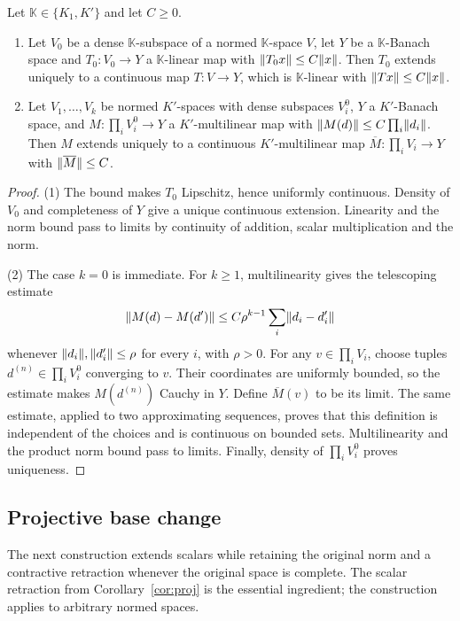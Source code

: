 \begin{samepage}
\begin{lemma}[extension]\label{lem:ext}
Let $\mathbb K\in\{K_1,K'\}$ and let $C\ge0$.
\begin{enumerate}
\item Let $V_0$ be a dense $\mathbb K$\nobreakdash-subspace of a normed $\mathbb K$\nobreakdash-space $V$, let $Y$ be a
$\mathbb K$\nobreakdash-Banach space and $T_0\colon V_0\to Y$ a $\mathbb K$\nobreakdash-linear map with $\lVert T_0x\rVert\le C\lVert x\rVert$. Then $T_0$ extends
uniquely to a continuous map $T\colon V\to Y$, which is $\mathbb K$\nobreakdash-linear with $\lVert Tx\rVert\le C\lVert x\rVert$.
\item Let $V_1,\dots,V_k$ be normed $K'$\nobreakdash-spaces with dense subspaces $V_i^0$, $Y$ a $K'$\nobreakdash-Banach space, and
$M\colon\prod_iV_i^0\to Y$ a $K'$\nobreakdash-multilinear map with $\lVert M(d)\rVert\le C\prod_i\lVert d_i\rVert$. Then $M$ extends uniquely to a
continuous $K'$\nobreakdash-multilinear map $\overline M\colon\prod_iV_i\to Y$ with $\lVert \overline M\rVert\le C$.
\end{enumerate}
\end{lemma}
\end{samepage}

\begin{proof}
(1) The bound makes $T_0$ Lipschitz, hence uniformly continuous. Density of $V_0$ and completeness of $Y$ give a
unique continuous extension. Linearity and the norm bound pass to limits by continuity of addition, scalar
multiplication and the norm.

(2) The case $k=0$ is immediate. For $k\ge1$, multilinearity gives the telescoping estimate
\[
\lVert M(d)-M(d')\rVert\le C\rho^{k-1}\sum_i\lVert d_i-d'_i\rVert
\]
whenever $\lVert d_i\rVert,\lVert d'_i\rVert\le\rho$ for every $i$, with $\rho>0$. For any $v\in\prod_iV_i$, choose tuples
$d^{(n)}\in\prod_iV_i^0$ converging to $v$. Their coordinates are uniformly bounded, so the estimate makes
$M(d^{(n)})$ Cauchy in $Y$. Define $\overline M(v)$ to be its limit. The same estimate, applied to two approximating
sequences, proves that this definition is independent of the choices and is continuous on bounded sets.
Multilinearity and the product norm bound pass to limits. Finally, density of $\prod_iV_i^0$ proves uniqueness.
\end{proof}

\subsection{Projective base change}
The next construction extends scalars while retaining the original norm and a contractive retraction whenever
the original space is complete. The scalar retraction from Corollary~\ref{cor:proj} is the essential ingredient;
the construction applies to arbitrary normed spaces.


